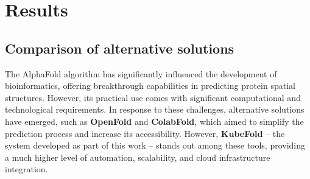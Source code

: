 \chapter{Results}
%
%


\section{Comparison of alternative solutions}

The AlphaFold algorithm has significantly influenced the development of bioinformatics, offering breakthrough capabilities in predicting protein spatial structures.
However, its practical use comes with significant computational and technological requirements.
In response to these challenges, alternative solutions have emerged, such as \textbf{OpenFold}\cite{openfold} and \textbf{ColabFold}\cite{colabfold}, which aimed to simplify the prediction process and increase its accessibility.
However, \textbf{KubeFold} – the system developed as part of this work – stands out among these tools, providing a much higher level of automation, scalability, and cloud infrastructure integration.

